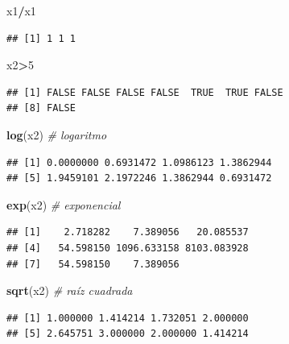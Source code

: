 \documentclass[
]{book}
\newenvironment{Shaded}{\begin{snugshade}}{\end{snugshade}}
\newcommand{\CommentTok}[1]{\textcolor[rgb]{0.56,0.35,0.01}{\textit{#1}}}
\newcommand{\DecValTok}[1]{\textcolor[rgb]{0.00,0.00,0.81}{#1}}
\newcommand{\KeywordTok}[1]{\textcolor[rgb]{0.13,0.29,0.53}{\textbf{#1}}}
\newcommand{\NormalTok}[1]{#1}
\newcommand{\OperatorTok}[1]{\textcolor[rgb]{0.81,0.36,0.00}{\textbf{#1}}}
\begin{document}
\begin{Shaded}
\begin{Highlighting}[]
\NormalTok{x1}\OperatorTok{/}\NormalTok{x1}
\end{Highlighting}
\end{Shaded}

\begin{verbatim}
## [1] 1 1 1
\end{verbatim}

\begin{Shaded}
\begin{Highlighting}[]
\NormalTok{x2}\OperatorTok{>}\DecValTok{5}
\end{Highlighting}
\end{Shaded}

\begin{verbatim}
## [1] FALSE FALSE FALSE FALSE  TRUE  TRUE FALSE
## [8] FALSE
\end{verbatim}

\begin{Shaded}
\begin{Highlighting}[]
\KeywordTok{log}\NormalTok{(x2) }\CommentTok{# logaritmo}
\end{Highlighting}
\end{Shaded}

\begin{verbatim}
## [1] 0.0000000 0.6931472 1.0986123 1.3862944
## [5] 1.9459101 2.1972246 1.3862944 0.6931472
\end{verbatim}

\begin{Shaded}
\begin{Highlighting}[]
\KeywordTok{exp}\NormalTok{(x2) }\CommentTok{# exponencial}
\end{Highlighting}
\end{Shaded}

\begin{verbatim}
## [1]    2.718282    7.389056   20.085537
## [4]   54.598150 1096.633158 8103.083928
## [7]   54.598150    7.389056
\end{verbatim}

\begin{Shaded}
\begin{Highlighting}[]
\KeywordTok{sqrt}\NormalTok{(x2) }\CommentTok{# raíz cuadrada}
\end{Highlighting}
\end{Shaded}

\begin{verbatim}
## [1] 1.000000 1.414214 1.732051 2.000000
## [5] 2.645751 3.000000 2.000000 1.414214
\end{verbatim}
\end{document}
